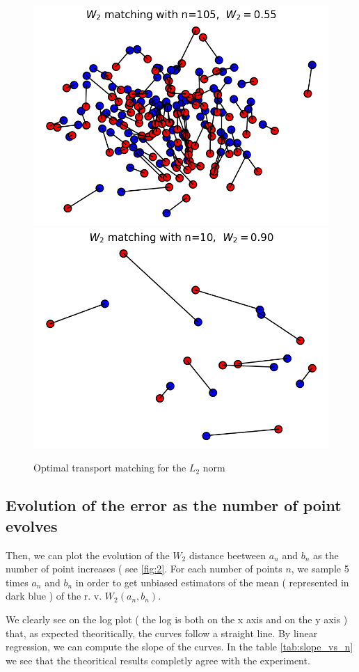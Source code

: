 \documentclass[a4paper,11pt]{article}
\begin{document}
\begin{figure}
        \centering
        \includegraphics[width=0.45\linewidth]{image/n105.png}
        \includegraphics[width=0.45\linewidth]{image/n10.png}
        \caption{Optimal transport matching for the $L_2$ norm}
        \label{fig:enter-label}
    \end{figure}

\subsection{Evolution of the error as the number of point evolves}

Then, we can plot the evolution of the $W_2$ distance beetween $a_n$ and $b_n$ as the number of point increases ( see \ref{fig:2}. For each number of points $n$, we sample 5 times $a_n$ and $b_n$ in order to get unbiased estimators of the mean ( represented in dark blue ) of the r. v. $W_2(a_n, b_n)$.

We clearly see on the log plot ( the log is both on the x axis and on the y axis ) that, as expected theoritically, the curves follow a straight line. By linear regression, we can compute the slope of the curves. In the table \ref{tab:slope_vs_n} we see that the theoritical results completly agree with the experiment.
\end{document}
